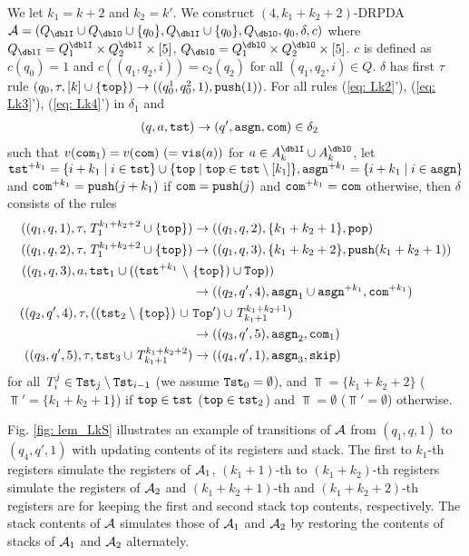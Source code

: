 We let $k_1=k+2$ and $k_2=k'$.
We construct $(4,k_1+k_2+2)$-DRPDA
$\calA=(Q_\dblI\cup Q_\dblO\cup\{q_0\}, Q_\dblI\cup\{q_0\}, Q_\dblO, q_0, \delta, c)$
where $Q_\dblI=Q^\dblI_1\times Q^\dblI_2\times[5]$,
$Q_\dblO=Q^\dblO_1\times Q^\dblO_2\times[5]$.
$c$ is defined as $c(q_0)=1$ and
$c((q_1,q_2,i))=c_2(q_2)$ for all $(q_1,q_2,i)\in Q$.
$\delta$ has first $\tau$ rule $(q_0,\tau,[k]\cup\{\mathtt{top}\})\to((q^1_0, q^2_0,1), \mathtt{push}(1))$.
For all rules (\ref{eq: Lk2}'), (\ref{eq: Lk3}'), (\ref{eq: Lk4}') in $\delta_1$ and
\begin{align}
(q, a, \mathtt{tst}) &\to (q',\mathtt{asgn}, \mathtt{com})\in\delta_2\label{eq: LkS1}
\end{align}
such that $v(\mathtt{com}_1)=v(\mathtt{com})\ (=\mathtt{vis}(a))$ for $a\in A^\dblI_{k}\cup A^\dblO_{k}$,
let $\mathtt{tst}^{+ k_1}=\{i+k_1\mid i\in\mathtt{tst}\}\cup\{\mathtt{top}\mid\mathtt{top}\in\mathtt{tst}\setminus[k_1]\}, \mathtt{asgn}^{+ k_1}=\{i+k_1\mid i\in\mathtt{asgn}\}$ and $\mathtt{com}^{+ k_1} = \mathtt{push}(j+k_1)$ if $\mathtt{com}=\mathtt{push}(j)$ and $\mathtt{com}^{+ k_1} = \mathtt{com}$ otherwise, then $\delta$ consists of the rules
\begin{align}
((q_1, q, 1), \tau, \T^{k_1+k_2+2}_{1}\cup\{\top\}) &\to ((q_1, q, 2), \{k_1+k_2+1\}, \pop)\label{eq: LkS5}\\
((q_1, q, 2), \tau, \T^{k_1+k_2+2}_{1}\cup\{\top\})&\to ((q_1, q, 3), \{k_1+k_2+2\}, \push(k_1+k_2+1))\label{eq: LkS6}\\
((q_1, q, 3), a,
\tst_1\cup ((\tst^{+ k_1}\ \setminus\ &\{\top\})\cup\Top))\nonumber\\
&\to ((q_2, q', 4), \asgn_1\cup\asgn^{+ k_1}, \com^{+ k_1})\label{eq: LkS7}\\
((q_2, q', 4), \tau,((\tst_2\setminus\{\top\})\ \cup\ &\Top')\cup\T^{k_1+k_2+1}_{k_1+1})\nonumber\\
&\to ((q_3, q', 5), \asgn_2, \com_1)\label{eq: LkS8}\\
((q_3, q', 5), \tau, \tst_3\cup\T^{k_1+k_2+2}_{k_1+1}) &\to ((q_4, q', 1), \asgn_3, \skip)\label{eq: LkS9}
\end{align}
for all $\mathit{T}^{j}_{i}\in\mathtt{Tst}_{j}\setminus\mathtt{Tst}_{i-1}$ (we assume $\mathtt{Tst}_0=\emptyset$), and
$\Top=\{k_1+k_2+2\}$ ($\Top'=\{k_1+k_2+1\}$) if $\mathtt{top}\in\mathtt{tst}$ ($\mathtt{top}\in\mathtt{tst}_2$) and $\Top=\emptyset$ ($\Top'=\emptyset$) otherwise.

Fig. \ref{fig: lem_LkS} illustrates an example of transitions of ${\cal A}$
from $(q_1,q,1)$ to $(q_4,q',1)$ with updating
contents of its registers and stack.
The first to $k_1$-th registers simulate
the registers of ${\cal A}_1$,
$(k_1+1)$-th to $(k_1+k_2)$-th registers simulate
the registers of ${\cal A}_2$ and
$(k_1+k_2+1)$-th and $(k_1+k_2+2)$-th registers
are for keeping the first and second stack top contents, respectively.
The stack contents of ${\cal A}$ simulates those of ${\cal A}_1$ and ${\cal A}_2$ by restoring the contents of stacks of ${\cal A}_1$ and ${\cal A}_2$ alternately.

